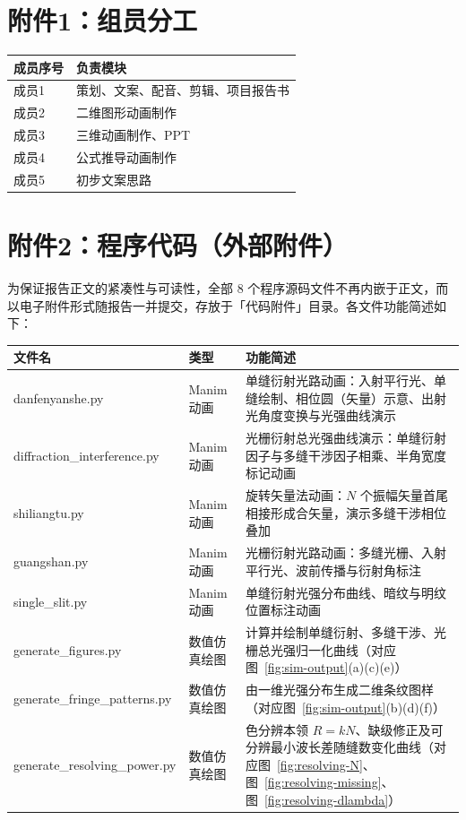 \documentclass[12pt,a4paper]{ctexrep}
\begin{document}
\chapter*{附件1：组员分工}

\begin{table}[htbp]
\centering
\begin{tabular}{ll}
\toprule
成员序号 & 负责模块 \\
\midrule
成员1 & 策划、文案、配音、剪辑、项目报告书 \\
成员2 & 二维图形动画制作 \\
成员3 & 三维动画制作、PPT \\
成员4 & 公式推导动画制作 \\
成员5 & 初步文案思路 \\
\bottomrule
\end{tabular}
\end{table}

\chapter*{附件2：程序代码（外部附件）}

为保证报告正文的紧凑性与可读性，全部 8 个程序源码文件不再内嵌于正文，而以电子附件形式随报告一并提交，存放于「代码附件」目录。各文件功能简述如下：

\begin{table}[htbp]
\centering
\small
\begin{tabular}{lll}
\toprule
文件名 & 类型 & 功能简述 \\
\midrule
danfenyanshe.py & Manim 动画 & 单缝衍射光路动画：入射平行光、单缝绘制、相位圆（矢量）示意、出射光角度变换与光强曲线演示 \\
diffraction\_interference.py & Manim 动画 & 光栅衍射总光强曲线演示：单缝衍射因子与多缝干涉因子相乘、半角宽度标记动画 \\
shiliangtu.py & Manim 动画 & 旋转矢量法动画：$N$ 个振幅矢量首尾相接形成合矢量，演示多缝干涉相位叠加 \\
guangshan.py & Manim 动画 & 光栅衍射光路动画：多缝光栅、入射平行光、波前传播与衍射角标注 \\
single\_slit.py & Manim 动画 & 单缝衍射光强分布曲线、暗纹与明纹位置标注动画 \\
generate\_figures.py & 数值仿真绘图 & 计算并绘制单缝衍射、多缝干涉、光栅总光强归一化曲线（对应图~\ref{fig:sim-output}(a)(c)(e)） \\
generate\_fringe\_patterns.py & 数值仿真绘图 & 由一维光强分布生成二维条纹图样（对应图~\ref{fig:sim-output}(b)(d)(f)） \\
generate\_resolving\_power.py & 数值仿真绘图 & 色分辨本领 $R=kN$、缺级修正及可分辨最小波长差随缝数变化曲线（对应图~\ref{fig:resolving-N}、图~\ref{fig:resolving-missing}、图~\ref{fig:resolving-dlambda}） \\
\bottomrule
\end{tabular}
\end{table}
\end{document}
